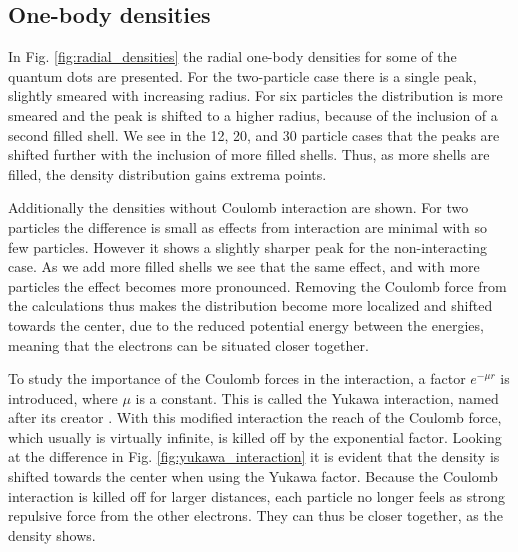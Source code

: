 \subsection{One-body densities}
	In Fig. \ref{fig:radial_densities} the radial one-body densities for some of the quantum dots are presented. For the two-particle case there is a single peak, slightly smeared with increasing radius. For six particles the distribution is more smeared and the peak is shifted to a higher radius, because of the inclusion of a second filled shell. We see in the 12, 20, and 30 particle cases that the peaks are shifted further with the inclusion of more filled shells. Thus, as more shells are filled, the density distribution gains extrema points. 

	Additionally the densities without Coulomb interaction are shown. For two particles the difference is small as effects from interaction are minimal with so few particles. However it shows a slightly sharper peak for the non-interacting case. As we add more filled shells we see that the same effect, and with more particles the effect becomes more pronounced. Removing the Coulomb force from the calculations thus makes the distribution become more localized and shifted towards the center, due to the reduced potential energy between the energies, meaning that the electrons can be situated closer together.

	To study the importance of the Coulomb forces in the interaction, a factor $e^{-\mu r}$ is introduced, where $\mu$ is a constant. This is called the Yukawa interaction, named after its creator \cite{yukawa1935interaction}. With this modified interaction the reach of the Coulomb force, which usually is virtually infinite, is killed off by the exponential factor. Looking at the difference in Fig. \ref{fig:yukawa_interaction} it is evident that the density is shifted towards the center when using the Yukawa factor. Because the Coulomb interaction is killed off for larger distances, each particle no longer feels as strong repulsive force from the other electrons. They can thus be closer together, as the density shows.

